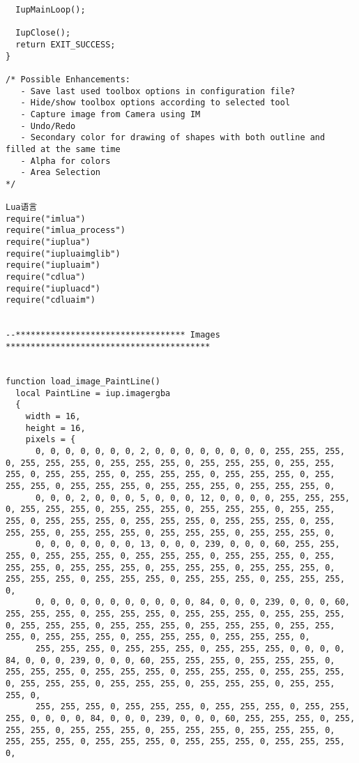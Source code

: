 \documentclass{ctexart}
\begin{document}
\begin{lstlisting}
  IupMainLoop();

  IupClose();
  return EXIT_SUCCESS;
}

/* Possible Enhancements: 
   - Save last used toolbox options in configuration file?
   - Hide/show toolbox options according to selected tool
   - Capture image from Camera using IM
   - Undo/Redo
   - Secondary color for drawing of shapes with both outline and filled at the same time
   - Alpha for colors
   - Area Selection
*/

Lua语言
require("imlua")
require("imlua_process")
require("iuplua")
require("iupluaimglib")
require("iupluaim")
require("cdlua")
require("iupluacd")
require("cdluaim")


--********************************** Images *****************************************


function load_image_PaintLine()
  local PaintLine = iup.imagergba
  {
    width = 16,
    height = 16,
    pixels = {
      0, 0, 0, 0, 0, 0, 0, 2, 0, 0, 0, 0, 0, 0, 0, 0, 255, 255, 255, 0, 255, 255, 255, 0, 255, 255, 255, 0, 255, 255, 255, 0, 255, 255, 255, 0, 255, 255, 255, 0, 255, 255, 255, 0, 255, 255, 255, 0, 255, 255, 255, 0, 255, 255, 255, 0, 255, 255, 255, 0, 255, 255, 255, 0, 
      0, 0, 0, 2, 0, 0, 0, 5, 0, 0, 0, 12, 0, 0, 0, 0, 255, 255, 255, 0, 255, 255, 255, 0, 255, 255, 255, 0, 255, 255, 255, 0, 255, 255, 255, 0, 255, 255, 255, 0, 255, 255, 255, 0, 255, 255, 255, 0, 255, 255, 255, 0, 255, 255, 255, 0, 255, 255, 255, 0, 255, 255, 255, 0, 
      0, 0, 0, 0, 0, 0, 0, 13, 0, 0, 0, 239, 0, 0, 0, 60, 255, 255, 255, 0, 255, 255, 255, 0, 255, 255, 255, 0, 255, 255, 255, 0, 255, 255, 255, 0, 255, 255, 255, 0, 255, 255, 255, 0, 255, 255, 255, 0, 255, 255, 255, 0, 255, 255, 255, 0, 255, 255, 255, 0, 255, 255, 255, 0, 
      0, 0, 0, 0, 0, 0, 0, 0, 0, 0, 0, 84, 0, 0, 0, 239, 0, 0, 0, 60, 255, 255, 255, 0, 255, 255, 255, 0, 255, 255, 255, 0, 255, 255, 255, 0, 255, 255, 255, 0, 255, 255, 255, 0, 255, 255, 255, 0, 255, 255, 255, 0, 255, 255, 255, 0, 255, 255, 255, 0, 255, 255, 255, 0, 
      255, 255, 255, 0, 255, 255, 255, 0, 255, 255, 255, 0, 0, 0, 0, 84, 0, 0, 0, 239, 0, 0, 0, 60, 255, 255, 255, 0, 255, 255, 255, 0, 255, 255, 255, 0, 255, 255, 255, 0, 255, 255, 255, 0, 255, 255, 255, 0, 255, 255, 255, 0, 255, 255, 255, 0, 255, 255, 255, 0, 255, 255, 255, 0, 
      255, 255, 255, 0, 255, 255, 255, 0, 255, 255, 255, 0, 255, 255, 255, 0, 0, 0, 0, 84, 0, 0, 0, 239, 0, 0, 0, 60, 255, 255, 255, 0, 255, 255, 255, 0, 255, 255, 255, 0, 255, 255, 255, 0, 255, 255, 255, 0, 255, 255, 255, 0, 255, 255, 255, 0, 255, 255, 255, 0, 255, 255, 255, 0, 

\end{lstlisting}
\end{document}
